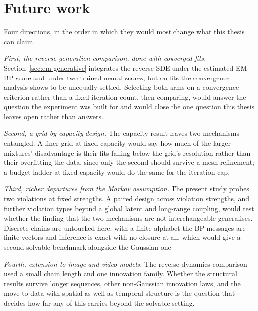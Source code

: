 \section{Future work}

Four directions, in the order in which they would most change what this thesis
can claim.

\emph{First, the reverse-generation comparison, done with converged fits.}
Section~\ref{sec:em-generative} integrates the reverse SDE under the estimated
EM--BP score and under two trained neural scores, but on fits the convergence
analysis shows to be unequally settled. Selecting both arms on a convergence
criterion rather than a fixed iteration count, then comparing, would answer the
question the experiment was built for and would close the one question this
thesis leaves open rather than answers.

\emph{Second, a grid-by-capacity design.} The capacity result leaves two
mechanisms entangled. A finer grid at fixed capacity would say how much of the
larger mixtures' disadvantage is their fits falling below the grid's resolution
rather than their overfitting the data, since only the second should survive a
mesh refinement; a budget ladder at fixed capacity would do the same for the
iteration cap.

\emph{Third, richer departures from the Markov assumption.} The present study
probes two violations at fixed strengths. A paired design across violation
strengths, and further violation types beyond a global latent and long-range
coupling, would test whether the finding that the two mechanisms are not
interchangeable generalises. Discrete chains are untouched here: with a finite
alphabet the BP messages are finite vectors and inference is exact with no
closure at all, which would give a second solvable benchmark alongside the
Gaussian one.

\emph{Fourth, extension to image and video models.} The reverse-dynamics
comparison used a small chain length and one innovation family. Whether the
structural results survive longer sequences, other non-Gaussian innovation laws,
and the move to data with spatial as well as temporal structure is the question
that decides how far any of this carries beyond the solvable setting.
